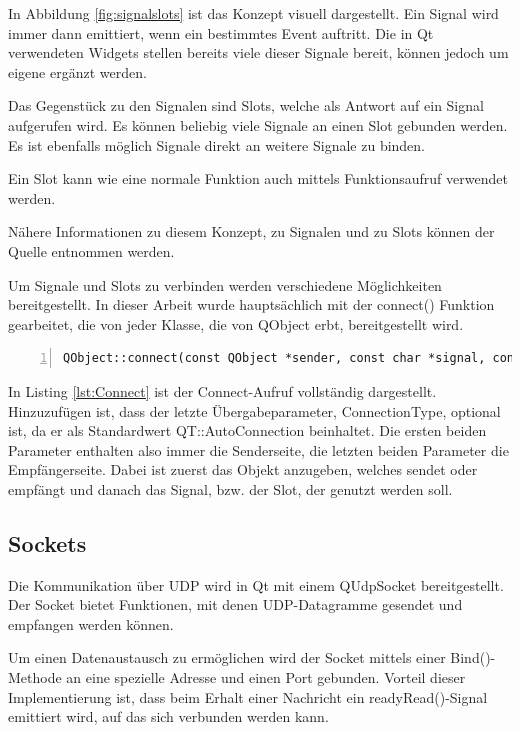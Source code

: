 In Abbildung \ref{fig:signalslots} ist das Konzept visuell dargestellt. Ein Signal wird immer dann emittiert, wenn ein bestimmtes Event auftritt. Die in Qt verwendeten Widgets stellen bereits viele dieser Signale bereit, können jedoch um eigene ergänzt werden. 

Das Gegenstück zu den Signalen sind Slots, welche als Antwort auf ein Signal aufgerufen wird. Es können beliebig viele Signale an einen Slot gebunden werden. Es ist ebenfalls möglich Signale direkt an weitere Signale zu binden. 

Ein Slot kann wie eine normale Funktion auch mittels Funktionsaufruf verwendet werden.  

Nähere Informationen zu diesem Konzept, zu Signalen und zu Slots können der Quelle \cite{qt_signalslot} entnommen werden. 

Um Signale und Slots zu verbinden werden verschiedene Möglichkeiten bereitgestellt. In dieser Arbeit wurde hauptsächlich mit der connect() Funktion gearbeitet, die von jeder Klasse, die von QObject erbt, bereitgestellt wird. 

\begin{lstlisting}[frame=single, breaklines=true, numbers=left, stepnumber=2, firstnumber=1, numberstyle = \tiny, caption=Connect Signals and Slots ,label=lst:Connect]
QObject::connect(const QObject *sender, const char *signal, const QObject *receiver, const char *method, Qt::ConnectionType type = Qt::AutoConnection)
\end{lstlisting}

In Listing \ref{lst:Connect} ist der Connect-Aufruf vollständig dargestellt. Hinzuzufügen ist, dass der letzte Übergabeparameter, ConnectionType, optional ist, da er als Standardwert QT::AutoConnection beinhaltet. Die ersten beiden Parameter enthalten also immer die Senderseite, die letzten beiden Parameter die Empfängerseite. Dabei ist zuerst das Objekt anzugeben, welches sendet oder empfängt und danach das Signal, bzw. der Slot, der genutzt werden soll. 

\subsection{Sockets}
\label{sec:QTSocket}

Die Kommunikation über UDP wird in Qt mit einem QUdpSocket bereitgestellt. Der Socket bietet Funktionen, mit denen UDP-Datagramme gesendet und empfangen werden können. 

Um einen Datenaustausch zu ermöglichen wird der Socket mittels einer Bind()-Methode an eine spezielle Adresse und einen Port gebunden. Vorteil dieser Implementierung ist, dass beim Erhalt einer Nachricht ein readyRead()-Signal emittiert wird, auf das sich verbunden werden kann. 

